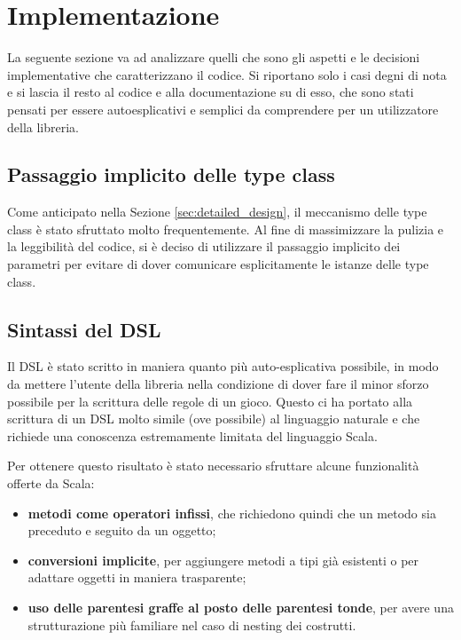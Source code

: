 \section{Implementazione}

La seguente sezione va ad analizzare quelli che sono gli aspetti e le decisioni implementative che caratterizzano il codice.
%
Si riportano solo i casi degni di nota e si lascia il resto al codice e alla documentazione su di esso, che sono stati pensati per essere autoesplicativi e semplici da comprendere per un utilizzatore della libreria.


\subsection{Passaggio implicito delle type class}

Come anticipato nella Sezione \ref{sec:detailed_design}, il meccanismo delle type class è stato sfruttato molto frequentemente.
%
Al fine di massimizzare la pulizia e la leggibilità del codice, si è deciso di utilizzare il passaggio implicito dei parametri per evitare di dover comunicare esplicitamente le istanze delle type class.


\subsection{Sintassi del DSL}

Il DSL è stato scritto in maniera quanto più auto-esplicativa possibile, in modo da mettere l'utente della libreria nella condizione di dover fare il minor sforzo possibile per la scrittura delle regole di un gioco.
%
Questo ci ha portato alla scrittura di un DSL molto simile (ove possibile) al linguaggio naturale e che richiede una conoscenza estremamente limitata del linguaggio Scala.

Per ottenere questo risultato è stato necessario sfruttare alcune funzionalità offerte da Scala:
\begin{itemize}
  \item \textbf{metodi come operatori infissi}, che richiedono quindi che un metodo sia preceduto e seguito da un oggetto;
  \item \textbf{conversioni implicite}, per aggiungere metodi a tipi già esistenti o per adattare oggetti in maniera trasparente;
  \item \textbf{uso delle parentesi graffe al posto delle parentesi tonde}, per avere una strutturazione più familiare nel caso di nesting dei costrutti.
\end{itemize}

